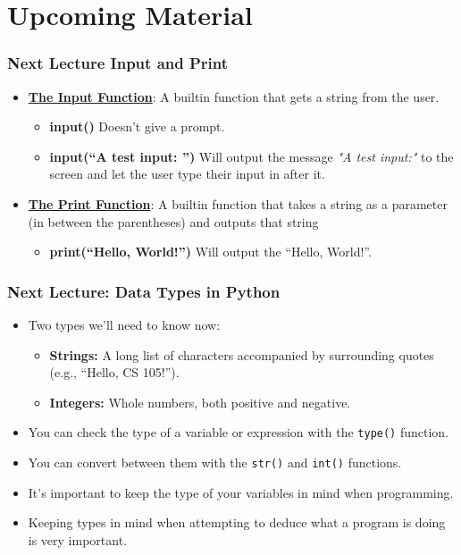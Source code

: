 \documentclass{beamer}
\begin{document}
\section{Upcoming Material}
\begin{frame}
  \frametitle{Next Lecture Input and Print}
  \begin{itemize}
    \item \underline{\textbf{The Input Function}}: A builtin function that gets a string from the user.
      \begin{itemize}
        \item \textbf{input()} \textrightarrow Doesn't give a prompt.
        \item \textbf{input(``A test input: '')} \textrightarrow Will output the message \textit{"A test input:"} to the screen and let the user type their input in after it.
      \end{itemize}
    \item \underline{\textbf{The Print Function}}: A builtin function that takes a string as a parameter (in between the parentheses) and outputs that string
      \begin{itemize}
        \item \textbf{print(``Hello, World!'')} \textrightarrow Will output the ``Hello, World!''. 
      \end{itemize}
  \end{itemize}
\end{frame}

%
%
\begin{frame}
  \frametitle{Next Lecture: Data Types in Python}
  \begin{itemize}
    \item Two types we'll need to know now:
      \begin{itemize}
        \item \textbf{Strings: } A long list of characters accompanied by surrounding quotes (e.g., ``Hello, CS 105!'').
        \item \textbf{Integers: } Whole numbers, both positive and negative.
      \end{itemize}
    \item You can check the type of a variable or expression with the \lstinline{type()} function.
    \item You can convert between them with the \lstinline{str()} and \lstinline{int()} functions.
    \item It's important to keep the type of your variables in mind when programming.
    \item Keeping types in mind when attempting to deduce what a program is doing is very important. 
  \end{itemize}
\end{frame}
\end{document}

